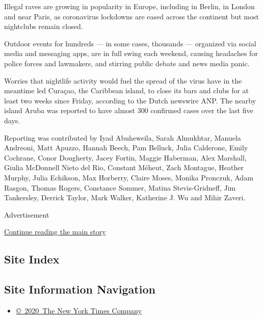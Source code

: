 Illegal raves are growing in popularity in Europe, including in Berlin,
in London and near Paris, as coronavirus lockdowns are eased across the
continent but most nightclubs remain closed.

Outdoor events for hundreds --- in some cases, thousands --- organized
via social media and messaging apps, are in full swing each weekend,
causing headaches for police forces and lawmakers, and stirring public
debate and news media panic.

Worries that nightlife activity would fuel the spread of the virus have
in the meantime led Curaçao, the Caribbean island, to close its bars and
clubs for at least two weeks since Friday, according to the Dutch
newswire ANP. The nearby island Aruba was reported to have almost 300
confirmed cases over the last five days.

Reporting was contributed by Iyad Abuheweila, Sarah Almukhtar, Manuela
Andreoni, Matt Apuzzo, Hannah Beech, Pam Belluck, Julia Calderone, Emily
Cochrane, Conor Dougherty, Jacey Fortin, Maggie Haberman, Alex Marshall,
Giulia McDonnell Nieto del Rio, Constant Méheut, Zach Montague, Heather
Murphy, Julia Echikson, Max Horberry, Claire Moses, Monika Pronczuk,
Adam Rasgon, Thomas Rogers, Constance Sommer, Matina Stevis-Gridneff,
Jim Tankersley, Derrick Taylor, Mark Walker, Katherine J. Wu and Mihir
Zaveri.

Advertisement

\protect\hyperlink{after-bottom}{Continue reading the main story}

\hypertarget{site-index}{%
\subsection{Site Index}\label{site-index}}

\hypertarget{site-information-navigation}{%
\subsection{Site Information
Navigation}\label{site-information-navigation}}

\begin{itemize}
\tightlist
\item
  \href{https://help.nytimes.com/hc/en-us/articles/115014792127-Copyright-notice}{©~2020~The
  New York Times Company}
\end{itemize}

